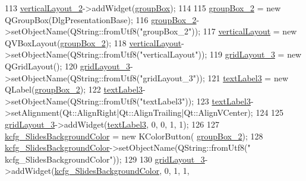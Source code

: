 \begin{DoxyCode}
113         \hyperlink{classUi__DlgPresentationBase_a3a84b15d28c24f8e1ae84d6c5c322290}{verticalLayout\_2}->addWidget(\hyperlink{classUi__DlgPresentationBase_a32e91831bba9e18b1bd040f092d18f7a}{groupBox});
114 
115         \hyperlink{classUi__DlgPresentationBase_a74ff79cdf30be7fcd1d8a52488d14bbf}{groupBox\_2} = \textcolor{keyword}{new} QGroupBox(DlgPresentationBase);
116         \hyperlink{classUi__DlgPresentationBase_a74ff79cdf30be7fcd1d8a52488d14bbf}{groupBox\_2}->setObjectName(QString::fromUtf8(\textcolor{stringliteral}{"groupBox\_2"}));
117         \hyperlink{classUi__DlgPresentationBase_a950c7e7e9d1c97a83bdce43745d2bb66}{verticalLayout} = \textcolor{keyword}{new} QVBoxLayout(\hyperlink{classUi__DlgPresentationBase_a74ff79cdf30be7fcd1d8a52488d14bbf}{groupBox\_2});
118         \hyperlink{classUi__DlgPresentationBase_a950c7e7e9d1c97a83bdce43745d2bb66}{verticalLayout}->setObjectName(QString::fromUtf8(\textcolor{stringliteral}{"verticalLayout"}));
119         \hyperlink{classUi__DlgPresentationBase_a0c291abc35eac2e0497a5c2f1187f8cc}{gridLayout\_3} = \textcolor{keyword}{new} QGridLayout();
120         \hyperlink{classUi__DlgPresentationBase_a0c291abc35eac2e0497a5c2f1187f8cc}{gridLayout\_3}->setObjectName(QString::fromUtf8(\textcolor{stringliteral}{"gridLayout\_3"}));
121         \hyperlink{classUi__DlgPresentationBase_ae5ef2f22ad09c5290e989c3979c7009f}{textLabel3} = \textcolor{keyword}{new} QLabel(\hyperlink{classUi__DlgPresentationBase_a74ff79cdf30be7fcd1d8a52488d14bbf}{groupBox\_2});
122         \hyperlink{classUi__DlgPresentationBase_ae5ef2f22ad09c5290e989c3979c7009f}{textLabel3}->setObjectName(QString::fromUtf8(\textcolor{stringliteral}{"textLabel3"}));
123         \hyperlink{classUi__DlgPresentationBase_ae5ef2f22ad09c5290e989c3979c7009f}{textLabel3}->setAlignment(Qt::AlignRight|Qt::AlignTrailing|Qt::AlignVCenter);
124 
125         \hyperlink{classUi__DlgPresentationBase_a0c291abc35eac2e0497a5c2f1187f8cc}{gridLayout\_3}->addWidget(\hyperlink{classUi__DlgPresentationBase_ae5ef2f22ad09c5290e989c3979c7009f}{textLabel3}, 0, 0, 1, 1);
126 
127         \hyperlink{classUi__DlgPresentationBase_aecb1ed8002c11e492aefffaf85263982}{kcfg\_SlidesBackgroundColor} = \textcolor{keyword}{new} KColorButton(
      \hyperlink{classUi__DlgPresentationBase_a74ff79cdf30be7fcd1d8a52488d14bbf}{groupBox\_2});
128         \hyperlink{classUi__DlgPresentationBase_aecb1ed8002c11e492aefffaf85263982}{kcfg\_SlidesBackgroundColor}->setObjectName(QString::fromUtf8(\textcolor{stringliteral}{"
      kcfg\_SlidesBackgroundColor"}));
129 
130         \hyperlink{classUi__DlgPresentationBase_a0c291abc35eac2e0497a5c2f1187f8cc}{gridLayout\_3}->addWidget(\hyperlink{classUi__DlgPresentationBase_aecb1ed8002c11e492aefffaf85263982}{kcfg\_SlidesBackgroundColor}, 0, 1, 1, 

\end{DoxyCode}
